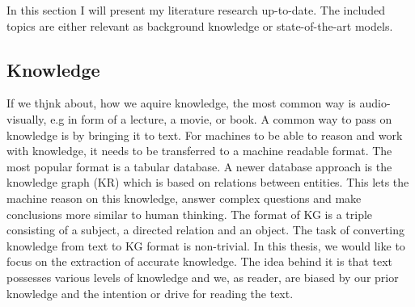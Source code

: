 In this section I will present my literature research up-to-date. The included topics are either relevant as background knowledge or state-of-the-art models.



\subsection{Knowledge}

If we thjnk about, how we aquire knowledge, the most common way is audio-visually, e.g in form of a lecture, a movie, or book. A common way to pass on knowledge is by bringing it to text. For machines to be able to reason and work with knowledge, it needs to be transferred to a machine readable format. The most popular format is a tabular database. A newer database approach is the knowledge graph (KR) which is based on relations between entities. This lets the machine reason on this knowledge, answer complex questions and make conclusions more similar to human thinking.
The format of KG is a triple consisting of a subject, a directed relation and an object.
The task of converting knowledge from text to KG format is non-trivial. In this thesis, we would like to focus on the extraction of accurate knowledge. The idea behind it is that text possesses various levels of knowledge and we, as reader, are biased by our prior knowledge and the intention or drive for reading the text. 

